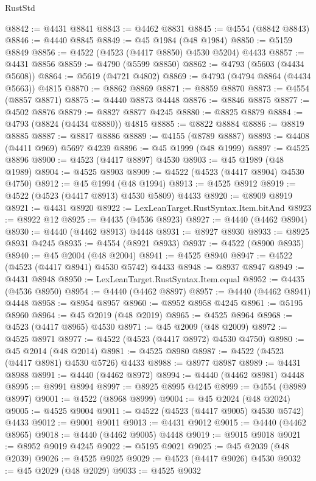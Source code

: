 \begin{lexlean}{RustStd}
\begin{coremodule}
{\begin{coremodule}
{{{{{{{{{{{{{{{{{{{{{{{{{{{{{{{{{{{{{{{{{{{{{{{{{{{{{{{{{{{{@8842 := @4431 @8841
@8843 := @4462 @8831
@8845 := @4554 (@8842 @8843)
@8846 := @4440 @8845
@8849 := @45 @1984 (@48 @1984)
@8850 := @5159 @8849
@8856 := @4522 (@4523 (@4417 @8850) @4530 @5204) @4433
@8857 := @4431 @8856
@8859 := @4790 (@5599 @8850)
@8862 := @4793 (@5603 (@4434 @5608))
@8864 := @5619 (@4721 @4802)
@8869 := @4793 (@4794 @8864 (@4434 @5663)) @4815
@8870 := @8862 @8869
@8871 := @8859 @8870
@8873 := @4554 (@8857 @8871)
@8875 := @4440 @8873 @4448
@8876 := @8846 @8875
@8877 := @4502 @8876
@8879 := @8827 @8877 @4245
@8880 := @8825 @8879
@8884 := @4793 (@8824 (@4434 @8880)) @4815
@8885 := @8822 @8884
@8886 := @8819 @8885
@8887 := @8817 @8886
@8889 := @4155 (@8789 @8887)
@8893 := @4408 (@4411 @969) @5697 @4239
@8896 := @45 @1999 (@48 @1999)
@8897 := @4525 @8896
@8900 := @4523 (@4417 @8897) @4530
@8903 := @45 @1989 (@48 @1989)
@8904 := @4525 @8903
@8909 := @4522 (@4523 (@4417 @8904) @4530 @4750)
@8912 := @45 @1994 (@48 @1994)
@8913 := @4525 @8912
@8919 := @4522 (@4523 (@4417 @8913) @4530 @5809) @4433
@8920 := @8909 @8919
@8921 := @4431 @8920
@8922 := LexLeanTarget.RustSyntax.Item.bitAnd
@8923 := @8922 @12
@8925 := @4435 (@4536 @8923)
@8927 := @4440 (@4462 @8904)
@8930 := @4440 (@4462 @8913) @4448
@8931 := @8927 @8930
@8933 := @8925 @8931 @4245
@8935 := @4554 (@8921 @8933)
@8937 := @4522 (@8900 @8935)
@8940 := @45 @2004 (@48 @2004)
@8941 := @4525 @8940
@8947 := @4522 (@4523 (@4417 @8941) @4530 @5742) @4433
@8948 := @8937 @8947
@8949 := @4431 @8948
@8950 := LexLeanTarget.RustSyntax.Item.equal
@8952 := @4435 (@4536 @8950)
@8954 := @4440 (@4462 @8897)
@8957 := @4440 (@4462 @8941) @4448
@8958 := @8954 @8957
@8960 := @8952 @8958 @4245
@8961 := @5195 @8960
@8964 := @45 @2019 (@48 @2019)
@8965 := @4525 @8964
@8968 := @4523 (@4417 @8965) @4530
@8971 := @45 @2009 (@48 @2009)
@8972 := @4525 @8971
@8977 := @4522 (@4523 (@4417 @8972) @4530 @4750)
@8980 := @45 @2014 (@48 @2014)
@8981 := @4525 @8980
@8987 := @4522 (@4523 (@4417 @8981) @4530 @5726) @4433
@8988 := @8977 @8987
@8989 := @4431 @8988
@8991 := @4440 (@4462 @8972)
@8994 := @4440 (@4462 @8981) @4448
@8995 := @8991 @8994
@8997 := @8925 @8995 @4245
@8999 := @4554 (@8989 @8997)
@9001 := @4522 (@8968 @8999)
@9004 := @45 @2024 (@48 @2024)
@9005 := @4525 @9004
@9011 := @4522 (@4523 (@4417 @9005) @4530 @5742) @4433
@9012 := @9001 @9011
@9013 := @4431 @9012
@9015 := @4440 (@4462 @8965)
@9018 := @4440 (@4462 @9005) @4448
@9019 := @9015 @9018
@9021 := @8952 @9019 @4245
@9022 := @5195 @9021
@9025 := @45 @2039 (@48 @2039)
@9026 := @4525 @9025
@9029 := @4523 (@4417 @9026) @4530
@9032 := @45 @2029 (@48 @2029)
@9033 := @4525 @9032
}}}}}}}}}}}}}}}}}}}}}}}}}}}}}}}}}}}}}}}}}}}}}}}}}}}}}}}}}}}}
\end{coremodule}}
\end{coremodule}
\end{lexlean}
